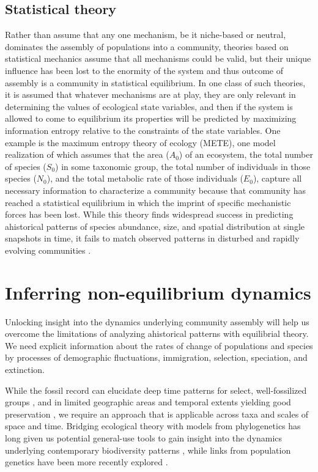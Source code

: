 \documentclass[12pt]{article}
\begin{document}
\subsection{Statistical theory}

Rather than assume that any one mechanism, be it niche-based or
neutral, dominates the assembly of populations into a community,
theories based on statistical mechanics assume that all mechanisms
could be valid, but their unique influence has been lost to the
enormity of the system and thus outcome of assembly is a community in
statistical equilibrium. In one class of such theories, it is assumed
that whatever mechanisms are at play, they are only relevant in
determining the values of ecological state variables, and then if the
system is allowed to come to equilibrium its properties will be
predicted by maximizing information entropy relative to the
constraints of the state variables.  One example is the maximum
entropy theory of ecology (METE), one model realization of which
assumes that the area ($A_0$) of an ecosystem, the total number of species
($S_0$) in some taxonomic group, the total number of individuals in those
species ($N_0$), and the total metabolic rate of those individuals ($E_0$),
capture all necessary information to characterize a community because
that community has reached a statistical equilibrium in which the
imprint of specific mechanistic forces has been lost. While this
theory finds widespread success in predicting ahistorical patterns of
species abundance, size, and spatial distribution \citep{Harte2011-um,
  White2012-yw, Xiao2015-jv, Harte2009-zq} at single snapshots in
time, it fails to match observed patterns in disturbed and rapidly
evolving communities \citep{Rominger2015-kb,Harte2011-um}.


\section{Inferring non-equilibrium dynamics}

Unlocking insight into the dynamics underlying community assembly will
help us overcome the limitations of analyzing ahistorical patterns
with equilibrial theory. We need explicit information about the rates
of change of populations and species by processes of demographic
fluctuations, immigration, selection, speciation, and extinction.

While the fossil record can elucidate deep time patterns for select,
well-fossilized groups \citep{Alroy2008-no}, and in limited geographic
areas and temporal extents yielding good preservation
\citep{Harnik2011-qe}, we require an approach that is applicable
across taxa and scales of space and time. Bridging ecological theory
with models from phylogenetics has long given us potential general-use
tools to gain insight into the dynamics underlying contemporary
biodiversity patterns \citep{Webb2002-yr, Emerson2002-mw,
  Lavergne2010-ts}, while links from population genetics have been
more recently explored \citep{Webb2002-yr, Emerson2002-mw,
  Lavergne2010-ts, Li2016-ns, McGaughran2015-sy, Laroche2015-qo,
  Vanoverbeke2015-ym, Vellend2005-qd,
  Papadopoulou2011-bd,Dexter2012-rn}. 
  
\end{document}
